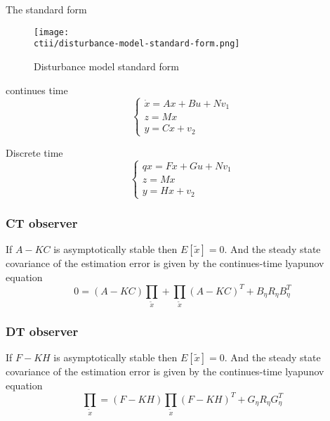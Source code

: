 \begin{multicols}{2}
The standard form 
\begin{figure}[H]
    \centering
    \texttt{[image: \\ctii/disturbance-model-standard-form.png]}
    \caption{Disturbance model standard form}
\end{figure}

continues time
\begin{equation*}
    \begin{cases}
        \dot{x} = Ax + Bu + Nv_1 \\
        z = Mx \\
        y = Cx + v_2
    \end{cases}
\end{equation*}

Discrete time
\begin{equation*}
    \begin{cases}
        qx = Fx + Gu + Nv_1 \\
        z = Mx \\
        y = Hx + v_2
    \end{cases}
\end{equation*}


\subsubsection{CT observer}

If $A-KC$ is asymptotically stable then $E[\tilde{x}]=0$. And the steady state 
covariance of the estimation error is given by the continues-time lyapunov equation
\begin{equation*}
    0 = (A-KC)\prod_{\tilde{x}} + \prod_{\tilde{x}}(A-KC)^T + B_{\eta}R_{\eta}B_{\eta}^T 
\end{equation*}


\subsubsection{DT observer}

If $F-KH$ is asymptotically stable then $E[\tilde{x}]=0$. And the steady state 
covariance of the estimation error is given by the continues-time lyapunov equation
\begin{equation*}
    \prod_{\tilde{x}} = (F-KH)\prod_{\tilde{x}}(F-KH)^T + G_{\eta}R_{\eta}G_{\eta}^T 
\end{equation*}



\end{multicols}
